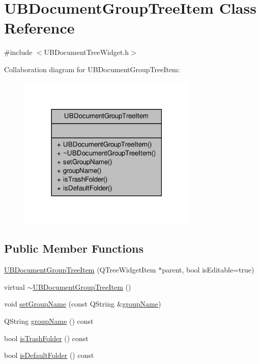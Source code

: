 \hypertarget{class_u_b_document_group_tree_item}{\section{U\-B\-Document\-Group\-Tree\-Item Class Reference}
\label{d6/d09/class_u_b_document_group_tree_item}
}


{\ttfamily \#include $<$U\-B\-Document\-Tree\-Widget.\-h$>$}



Collaboration diagram for U\-B\-Document\-Group\-Tree\-Item\-:
\nopagebreak
\begin{figure}[H]
\begin{center}
\leavevmode
\includegraphics[width=242pt]{d7/de2/class_u_b_document_group_tree_item__coll__graph}
\end{center}
\end{figure}
\subsection*{Public Member Functions}
\begin{DoxyCompactItemize}
\item 
\hyperlink{class_u_b_document_group_tree_item_a3428bafedc202fd11904f0e2275d1bcf}{U\-B\-Document\-Group\-Tree\-Item} (Q\-Tree\-Widget\-Item $\ast$parent, bool is\-Editable=true)
\item 
virtual \hyperlink{class_u_b_document_group_tree_item_ac6528626071830e168dae0122e70bf2d}{$\sim$\-U\-B\-Document\-Group\-Tree\-Item} ()
\item 
void \hyperlink{class_u_b_document_group_tree_item_a920805114fd1d2b15f63020450919444}{set\-Group\-Name} (const Q\-String \&\hyperlink{class_u_b_document_group_tree_item_afe019d754a5f3255c780be3af2027c0e}{group\-Name})
\item 
Q\-String \hyperlink{class_u_b_document_group_tree_item_afe019d754a5f3255c780be3af2027c0e}{group\-Name} () const 
\item 
bool \hyperlink{class_u_b_document_group_tree_item_a8099a11f701735707a2fbee80685f02a}{is\-Trash\-Folder} () const 
\item 
bool \hyperlink{class_u_b_document_group_tree_item_a05404fc8707f4f1f12e85ab51130b1e6}{is\-Default\-Folder} () const 
\end{DoxyCompactItemize}


